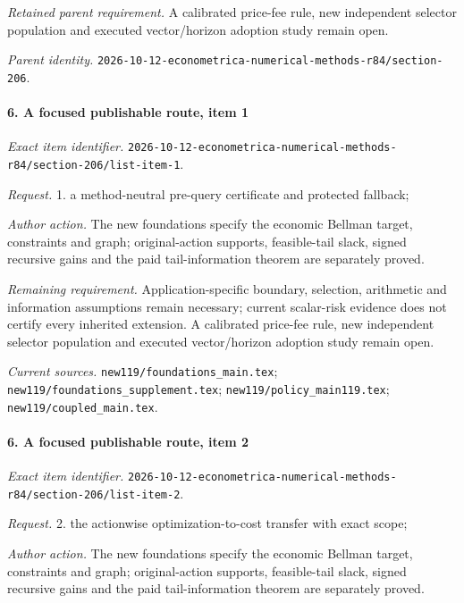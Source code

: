 \par\emph{Retained parent requirement.} A calibrated price-fee rule, new independent selector population and executed vector/\allowbreak{}horizon adoption study remain open.

\par\emph{Parent identity.} \nolinkurl{2026-10-12-econometrica-numerical-methods-r84/section-206}.

\paragraph{6. A focused publishable route, item 1}

\emph{Exact item identifier.} \nolinkurl{2026-10-12-econometrica-numerical-methods-r84/section-206/list-item-1}.

\par\emph{Request.} 1. a method-neutral pre-query certificate and protected fallback;

\par\emph{Author action.} The new foundations specify the economic Bellman target, constraints and graph; original-action supports, feasible-tail slack, signed recursive gains and the paid tail-information theorem are separately proved.

\par\emph{Remaining requirement.} Application-specific boundary, selection, arithmetic and information assumptions remain necessary; current scalar-risk evidence does not certify every inherited extension. A calibrated price-fee rule, new independent selector population and executed vector/\allowbreak{}horizon adoption study remain open.

\par\emph{Current sources.} \nolinkurl{new119/foundations_main.tex}; \nolinkurl{new119/foundations_supplement.tex}; \nolinkurl{new119/policy_main119.tex}; \nolinkurl{new119/coupled_main.tex}.

\paragraph{6. A focused publishable route, item 2}

\emph{Exact item identifier.} \nolinkurl{2026-10-12-econometrica-numerical-methods-r84/section-206/list-item-2}.

\par\emph{Request.} 2. the actionwise optimization-to-cost transfer with exact scope;

\par\emph{Author action.} The new foundations specify the economic Bellman target, constraints and graph; original-action supports, feasible-tail slack, signed recursive gains and the paid tail-information theorem are separately proved.

